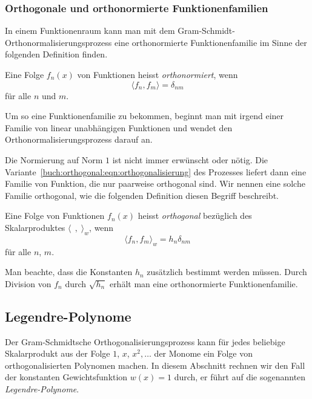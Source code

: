 %
%
\subsubsection{Orthogonale und orthonormierte Funktionenfamilien}
In einem Funktionenraum kann man mit dem
Gram-Schmidt-Orthonormalisierungsprozess eine 
orthonormierte Funktionenfamilie im Sinne der folgenden Definition
finden.

\begin{definition}
Eine Folge $f_n(x)$ von Funktionen heisst {\em orthonormiert}, wenn 
%
\[
\langle f_n,f_m\rangle = \delta_{nm}
\]
für alle $n$ und $m$.
\end{definition}

Um so eine Funktionenfamilie zu bekommen, beginnt man mit irgend
einer Familie von linear unabhängigen Funktionen und wendet den
Orthonormalisierungsprozess darauf an.

Die Normierung auf Norm $1$ ist nicht immer erwünscht oder nötig. 
Die Variante~\eqref{buch:orthogonal:eqn:orthogonalisierung}
des Prozesses liefert dann eine Familie von Funktion, die nur
paarweise orthogonal sind.
Wir nennen eine solche Familie orthogonal, wie die folgenden Definition
diesen Begriff beschreibt.

\begin{definition}
\label{buch:orthogonal:def:orthogonal}
Eine Folge von Funktionen $f_n(x)$ heisst {\em orthogonal} bezüglich des
%
Skalarproduktes $\langle\,\;,\;\rangle_w$, wenn
\[
\langle f_n,f_m\rangle_w = h_n \delta_{nm}
\]
für alle $n$, $m$.
\end{definition}

Man beachte, dass die Konstanten $h_n$ zusätzlich bestimmt werden müssen.
Durch Division von $f_n$ durch $\sqrt{h_n}$ erhält man eine
orthonormierte Funktionenfamilie.

%
%
\subsection{Legendre-Polynome
\label{buch:orthogonal:subsection:legendre-polynome}}
Der Gram-Schmidtsche Orthogonalisierungsprozess kann für jedes beliebige
Skalarprodukt aus der Folge $1$, $x$, $x^2,\dots$ der Monome ein
Folge von orthogonalisierten Polynomen machen.
In diesem Abschnitt rechnen wir den Fall der konstanten Gewichtsfunktion
$w(x)=1$ durch, er führt auf die sogenannten {\em Legendre-Polynome}.

